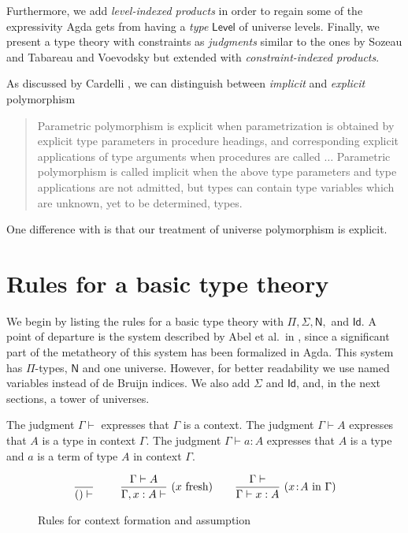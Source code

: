 \documentclass[11pt,a4paper]{article}
\theoremstyle{definition}
\newcommand{\Id}{\mathsf{Id}}
\newcommand{\NN}{\mathsf{N}}
\newcommand{\AgdaLevel}{\mathsf{Level}}
\begin{document}
Furthermore, we add
\emph{level-indexed products} in order to regain some of the expressivity Agda gets from having a \emph{type}
$\AgdaLevel$ of universe levels.
Finally, we present a type theory with constraints as \emph{judgments} similar to the ones by Sozeau and Tabareau \cite{SozeauTabareau:coq} and Voevodsky \cite{VV}  but extended with \emph{constraint-indexed products}.

As discussed by Cardelli \cite{Cardelli87}, we can distinguish between {\em implicit} and {\em explicit}
polymorphism
\begin{quotation}
  Parametric polymorphism is explicit when parametrization is obtained by
explicit type parameters in procedure headings, and corresponding explicit
applications of type arguments when procedures are called $\dots$
Parametric polymorphism is called implicit when the above type parameters and type applications are not admitted, but
types can contain type variables which are unknown, yet to be determined, types.
\end{quotation}
One difference with \cite{SozeauTabareau:coq} is that our treatment of universe polymorphism
is explicit.

\section{Rules for a basic type theory}\label{sec:basic}

We begin by listing the rules for a basic type theory
with $\Pi, \Sigma, \NN,$ and $\Id$. A point of departure is
the system described by Abel et al.\ in \cite{abel18}, since a
significant part of the metatheory of this system has been formalized in Agda.
This system has $\Pi$-types, $\NN$ and one universe.
However, for better readability we use named variables instead
of de Bruijn indices. We also add $\Sigma$ and $\Id$, and,
in the next sections, a tower of universes.

The judgment $\Gamma\vdash$ expresses that $\Gamma$ is a context.
The judgment $\Gamma\vdash A$ expresses that $A$ is a type in context $\Gamma$.
The judgment $\Gamma\vdash a:A$ expresses that $A$ is a type
and $a$ is a term of type $A$ in context $\Gamma$.

\begin{figure}[h]
  \caption{Rules for context formation and assumption}\label{fig:context}
$$
\frac{}{()\vdash}~~~~~~~
\frac{\Gamma\vdash A}{\Gamma,x:A\vdash}~(x~\text{fresh})~~~~~~
\frac{\Gamma\vdash}{\Gamma\vdash x:A}~(x\!:\! A~\text{in}~\Gamma)
\belowdisplayshortskip 0pt
$$
\end{figure}
\end{document}
